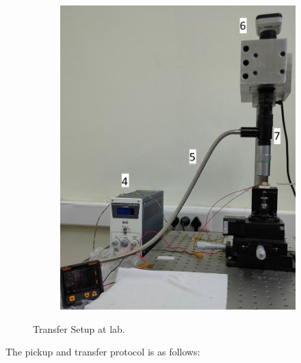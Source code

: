 \begin{figure}[H]
\begin{minipage}{.45\linewidth}
\begin{subfigure}[b]{0.9\textwidth}
		\end{subfigure}
	\end{minipage}%
	\begin{subfigure}{0.45\textwidth}
		\centering
		\includegraphics[width=\textwidth]{figures/trset2.jpg}
	\end{subfigure}
	\caption{Transfer Setup at lab.}
	\label{fig:tr_set}
\end{figure}

The pickup and transfer protocol is as follows:


